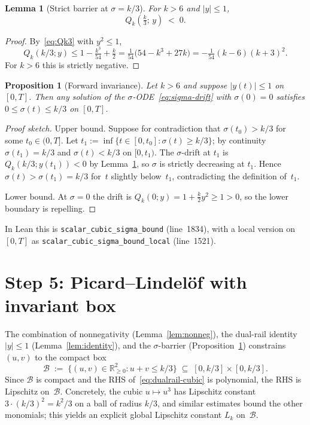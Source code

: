 \documentclass[11pt]{article}
\newtheorem{lemma}[theorem]{Lemma}
\newtheorem{proposition}[theorem]{Proposition}
\newcommand{\R}{\mathbb{R}}
\begin{document}
\begin{lemma}[Strict barrier at $\sigma = k/3$]\label{lem:barrier}
For $k > 6$ and $|y| \le 1$,
\[
  Q_{k}\!\left(\tfrac{k}{3};\, y\right) \;<\; 0.
\]
\end{lemma}

\begin{proof}
By~\eqref{eq:Qk3} with $y^{2} \le 1$,
\[
  Q_{k}(k/3; y) \le 1 - \tfrac{k^{3}}{54} + \tfrac{k}{2}
  = \tfrac{1}{54}\bigl(54 - k^{3} + 27 k\bigr)
  = -\tfrac{1}{54}(k - 6)(k + 3)^{2}.
\]
For $k > 6$ this is strictly negative.
\end{proof}

\begin{proposition}[Forward invariance]\label{prop:invariant}
Let $k > 6$ and suppose $|y(t)| \le 1$ on $[0, T]$.  Then any solution of the
$\sigma$-ODE~\eqref{eq:sigma-drift} with $\sigma(0) = 0$ satisfies
$0 \le \sigma(t) \le k/3$ on $[0, T]$.
\end{proposition}

\begin{proof}[Proof sketch]
Upper bound.  Suppose for contradiction that $\sigma(t_{0}) > k/3$ for some
$t_{0} \in (0, T]$.  Let $t_{1} := \inf\{t \in [0, t_{0}] : \sigma(t) \ge k/3\}$;
by continuity $\sigma(t_{1}) = k/3$ and $\sigma(t) < k/3$ on $[0, t_{1})$.  The
$\sigma$-drift at $t_{1}$ is $Q_{k}(k/3; y(t_{1})) < 0$ by
Lemma~\ref{lem:barrier}, so $\sigma$ is strictly decreasing at $t_{1}$.  Hence
$\sigma(t) > \sigma(t_{1}) = k/3$ for~$t$ slightly below~$t_{1}$, contradicting
the definition of~$t_{1}$.

Lower bound.  At $\sigma = 0$ the drift is
$Q_{k}(0; y) = 1 + \tfrac{k}{2} y^{2} \ge 1 > 0$, so the lower boundary is
repelling.
\end{proof}

In Lean this is \texttt{scalar\_cubic\_sigma\_bound} (line~1834), with a local
version on $[0, T]$ as \texttt{scalar\_cubic\_sigma\_bound\_local}
(line~1521).

\section{Step 5: Picard--Lindel\"of with invariant box}\label{sec:picard}

The combination of nonnegativity (Lemma~\ref{lem:nonneg}), the dual-rail
identity $|y| \le 1$ (Lemma~\ref{lem:identity}), and the $\sigma$-barrier
(Proposition~\ref{prop:invariant}) constrains $(u, v)$ to the compact box
\[
  \mathcal{B} \;:=\; \{(u, v) \in \R_{\ge 0}^{2} : u + v \le k/3\}
  \;\subseteq\; [0, k/3] \times [0, k/3].
\]
Since $\mathcal{B}$ is compact and the RHS of~\eqref{eq:dualrail-cubic} is
polynomial, the RHS is Lipschitz on~$\mathcal{B}$.  Concretely, the cubic
$u \mapsto u^{3}$ has Lipschitz constant $3 \cdot (k/3)^{2} = k^{2}/3$ on a
ball of radius $k/3$, and similar estimates bound the other monomials; this
yields an explicit global Lipschitz constant $L_{k}$ on~$\mathcal{B}$.
\end{document}
